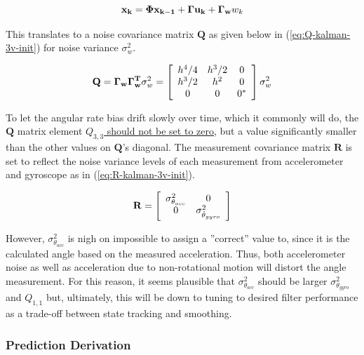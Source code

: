 \documentclass[a4paper]{report}
\begin{document}
\begin{equation}
\mathbf{x_{k}} = \mathbf{\Phi x_{k-1}} + \mathbf{\Gamma u_{k}} + \mathbf{\Gamma_w}w_k \\
\label{eq:disc-sys-kalman-3s-noise}
\end{equation}

This translates to a noise covariance matrix $\mathbf{Q}$ as given below in (\ref{eq:Q-kalman-3v-init}) for noise variance $\sigma^2_w$.

\begin{equation}
\label{eq:Q-kalman-3v-init}
\mathbf{Q} = \mathbf{\Gamma_w \Gamma_w^T} \sigma^2_w = 
\left[
\begin{array}{c c c}
h^4/4 & h^3/2 & 0 \\
h^3/2 & h^2 & 0 \\
0 & 0 & 0^{*}
\end{array}\right] \sigma^2_w
\end{equation}

To let the angular rate bias drift slowly over time, which it commonly will do, the $\mathbf{Q}$ matrix element \underline{$Q_{3,3}$ should not be set to zero}, but a value significantly smaller than the other values on $\mathbf{Q}$'s diagonal. The measurement covariance matrix $\mathbf{R}$ is set to reflect the noise variance levels of each measurement from accelerometer and gyroscope as in (\ref{eq:R-kalman-3v-init}). 

\begin{equation}
\label{eq:R-kalman-3v-init}
\mathbf{R} =
\left[
\begin{array}{c c c}
\sigma^2 _{\theta_{acc}} & 0 \\
0 & \sigma^2 _{\dot{\theta}_{gyro}} 
\end{array}\right]
\end{equation}

However, $\sigma^2 _{\theta_{acc}}$ is nigh on impossible to assign a ''correct'' value to, since it is the calculated angle based on the measured acceleration. Thus, both accelerometer noise as well as acceleration due to non-rotational motion will distort the angle measurement. For this reason, it seems plausible that $\sigma^2 _{\theta_{acc}}$ should be larger $\sigma^2 _{\theta_{gyro}}$ and $Q_{1,1}$ but, ultimately, this will be down to tuning to desired filter performance as a trade-off between state tracking and smoothing.

		\subsubsection{Prediction Derivation}
\end{document}
